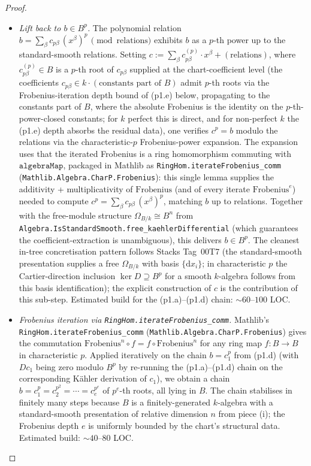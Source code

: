 \begin{proof}
\begin{itemize}
    \item[(p1.d)] \emph{Lift back to \(b \in B^p\).} The polynomial relation \(b = \sum_\beta c_{p \beta}\,(x^\beta)^{p}\,\pmod{\text{relations}}\) exhibits \(b\) as a \(p\)-th power up to the standard-smooth relations. Setting \(c := \sum_\beta c_{p \beta}^{(p)} \cdot x^\beta + (\text{relations})\), where \(c_{p \beta}^{(p)} \in B\) is a \(p\)-th root of \(c_{p \beta}\) supplied at the chart-coefficient level (the coefficients \(c_{p \beta} \in k \cdot (\text{constants part of } B)\) admit \(p\)-th roots via the Frobenius-iteration depth bound of (p1.e) below, propagating to the constants part of \(B\), where the absolute Frobenius is the identity on the \(p\)-th-power-closed constants; for \(k\) perfect this is direct, and for non-perfect \(k\) the (p1.e) depth absorbs the residual data), one verifies \(c^{p} = b\) modulo the relations via the characteristic-\(p\) Frobenius-power expansion. The expansion uses that the iterated Frobenius is a ring homomorphism commuting with \(\mathtt{algebraMap}\), packaged in Mathlib as \texttt{RingHom.iterateFrobenius\_comm} (\texttt{Mathlib.Algebra.CharP.Frobenius}): this single lemma supplies the additivity + multiplicativity of \(\mathrm{Frobenius}\) (and of every iterate \(\mathrm{Frobenius}^{e}\)) needed to compute \(c^p = \sum_\beta c_{p \beta}\,(x^\beta)^{p}\), matching \(b\) up to relations. Together with the free-module structure \(\Omega_{B/k} \cong B^{n}\) from \texttt{Algebra.IsStandardSmooth.free\_kaehlerDifferential} (which guarantees the coefficient-extraction is unambiguous), this delivers \(b \in B^p\). The cleanest in-tree concretisation pattern follows Stacks Tag~00T7 (the standard-smooth presentation supplies a free \(\Omega_{B/k}\) with basis \(\{\mathrm dx_i\}\); in characteristic \(p\) the Cartier-direction inclusion \(\ker D \supseteq B^p\) for a smooth \(k\)-algebra follows from this basis identification); the explicit construction of \(c\) is the contribution of this sub-step. Estimated build for the (p1.a)--(p1.d) chain: \(\sim 60\)--\(100\) LOC.
    \item[(p1.e)] \emph{Frobenius iteration via \texttt{RingHom.iterateFrobenius\_comm}.} Mathlib's \texttt{RingHom.iterateFrobenius\_comm} (\texttt{Mathlib.Algebra.CharP.Frobenius}) gives the commutation \(\mathrm{Frobenius}^n \circ f = f \circ \mathrm{Frobenius}^n\) for any ring map \(f \colon B \to B\) in characteristic \(p\). Applied iteratively on the chain \(b = c_1^p\) from (p1.d) (with \(D c_1\) being zero modulo \(B^p\) by re-running the (p1.a)--(p1.d) chain on the corresponding K\"ahler derivation of \(c_1\)), we obtain a chain \(b = c_1^p = c_2^{p^2} = \cdots = c_e^{p^e}\) of \(p^e\)-th roots, all lying in \(B\). The chain stabilises in finitely many steps because \(B\) is a finitely-generated \(k\)-algebra with a standard-smooth presentation of relative dimension \(n\) from piece (i); the Frobenius depth \(e\) is uniformly bounded by the chart's structural data. Estimated build: \(\sim 40\)--\(80\) LOC.

\end{itemize}
\end{proof}
